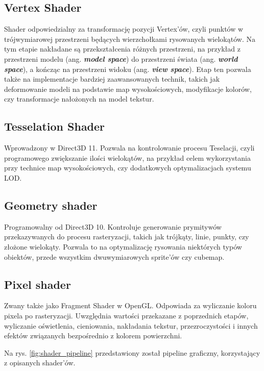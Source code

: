 \subsection{Vertex Shader}
Shader odpowiedzialny za transformację pozycji Vertex'ów, czyli punktów
w trójwymiarowej przestrzeni będących wierzchołkami rysowanych
wielokątów. Na tym etapie nakładane są przekształcenia różnych
przestrzeni, na przykład z przestrzeni modelu (ang. \emph{\textbf{model
		space}}) do przestrzeni świata (ang. \emph{\textbf{world space}}), a
kończąc na przestrzeni widoku (ang. \emph{\textbf{view space}}). Etap ten pozwala także na implementacje bardziej zaawansowanych technik,
takich jak deformowanie modeli na podstawie map wysokościowych,
modyfikacje kolorów, czy transformacje nałożonych na model tekstur.

\subsection{Tesselation Shader}
Wprowadzony w Direct3D 11. Pozwala na kontrolowanie procesu Teselacji,
czyli programowego zwiększanie ilości wielokątów, na przykład celem
wykorzystania przy technice map wysokościowych, czy dodatkowych
optymalizacjach systemu LOD.

\subsection{Geometry shader}
Programowalny od Direct3D 10. Kontroluje generowanie prymitywów
przekazywanych do procesu rasteryzacji, takich jak trójkąty, linie,
punkty, czy złożone wielokąty. Pozwala to na optymalizację rysowania
niektórych typów obiektów, przede wszystkim dwuwymiarowych sprite'ów czy
cubemap.

\subsection{Pixel shader}
Zwany także jako Fragment Shader w OpenGL. Odpowiada za wyliczanie
koloru pixela po rasteryzacji. Uwzględnia wartości przekazane z
poprzednich etapów, wyliczanie oświetlenia, cieniowania, nakładania
tekstur, przezroczystości i innych efektów związanych bezpośrednio z
kolorem powierzchni.

Na rys. \ref{fig:shader_pipeline} przedstawiony został pipeline graficzny, korzystający z opisanych shader'ów.

